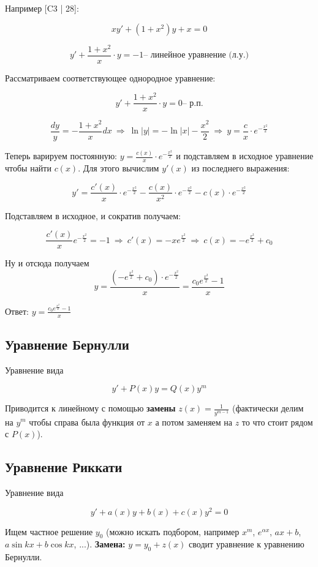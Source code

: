 Например [C3 | 28]:

\[
xy'+(1+x^2)y+x=0
\]

\[
y'+\frac{1+x^2}{x}\cdot y=-1 \text{-- линейное уравнение (л.у.)}
\]

Рассматриваем соответствующее однородное уравнение:

\[
y'+\frac{1+x^2}{x}\cdot y=0 \text{-- р.п.}
\]

\[
\frac{dy}{y}=-\frac{1+x^2}{x}dx\ \Rightarrow \ \ln{|y|}=-\ln{|x|}-\frac{x^2}{2} \ \Rightarrow \ y=\frac{c}{x}\cdot e^{-\frac{x^2}{2}} 
\]

Теперь варируем постоянную: $y=\frac{c(x)}{x}\cdot e^{-\frac{x^2}{2}}$ и подставляем в исходное уравнение чтобы найти $c(x)$. Для этого вычислим $y'(x)$ из последнего выражения:

\[
y'=\frac{c'(x)}{x}\cdot e^{-\frac{x^2}{2}}-\frac{c(x)}{x^2}\cdot e^{-\frac{x^2}{2}}-c(x)\cdot e^{-\frac{x^2}{2}}
\]

Подставляем в исходное, и сократив получаем:

\[
\frac{c'(x)}{x}e^{-\frac{x^2}{2}}=-1 \ \Rightarrow \ c'(x)=-xe^{\frac{x^2}{2}} \ \Rightarrow \ c(x)=-e^{\frac{x^2}{2}}+c_0
\]

Ну и отсюда получаем
\[
y=\frac{(-e^{\frac{x^2}{2}}+c_0)\cdot e^{-\frac{x^2}{2}}}{x}=\frac{c_0e^{\frac{x^2}{2}}-1}{x}
\]

Ответ: $y=\frac{c_0e^{\frac{x^2}{2}}-1}{x}$

\subsection{Уравнение Бернулли}

Уравнение вида

\[
y'+P(x)y=Q(x)y^m
\]

Приводится к линейному с помощью \textbf{замены} $z(x)=\frac{1}{y^{m-1}}$ (фактически делим на $y^m$ чтобы справа была функция от $x$ а потом заменяем на $z$ то что стоит рядом с $P(x)$).

\subsection{Уравнение Риккати}

Уравнение вида

\[
y'+a(x)y+b(x)+c(x)y^2=0
\]

Ищем частное решение $y_0$ (можно искать подбором, например $x^m$, $e^{\alpha x}$, $ax+b$, $a\sin{kx}+b\cos{kx}$, ...). \textbf{Замена:} $y=y_0+z(x)$ сводит уравнение к уравнению Бернулли.

